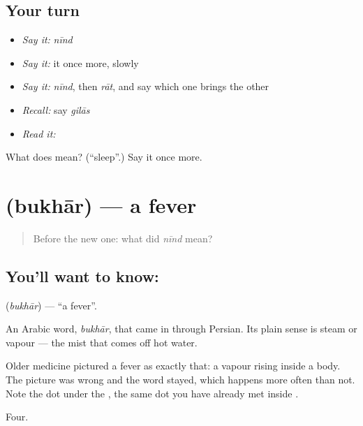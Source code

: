 \subsection*{Your turn}
\begin{itemize}
\raggedright
  \item \emph{Say it:} \emph{nīnd}
  \item \emph{Say it:} it once more, slowly
  \item \emph{Say it:} \emph{nīnd}, then \emph{rāt}, and say which one brings the other
  \item \emph{Recall:} say \emph{gilās}
  \item \emph{Read it:} \textbf{}
\end{itemize}

\begin{tcolorbox}[breakable,colback=teal!4,colframe=teal!35!black,title={Before you move on}]
What does  mean? (\textquotedblleft{}sleep\textquotedblright{}.) Say it once more.
\end{tcolorbox}
\section[\texorpdfstring{\hi{बुख़ार} (bukhār)}{बुख़ार (bukhār)}]{ (bukhār) — a fever}

\label{lesson:HI-C63-fever}



\begin{quote}
Before the new one: what did \emph{nīnd} mean?
\end{quote}

\subsection*{You'll want to know: }
\textbf{} (\emph{bukhār}) — \textquotedblleft{}a fever\textquotedblright{}.

An Arabic word, \emph{bukhār}, that came in through Persian. Its plain sense is steam or vapour — the mist that comes off hot water.

Older medicine pictured a fever as exactly that: a vapour rising inside a body. The picture was wrong and the word stayed, which happens more often than not. Note the dot under the , the same dot you have already met inside .

\begin{grammarlens}[title={What you've built}]
Four.
\end{grammarlens}


